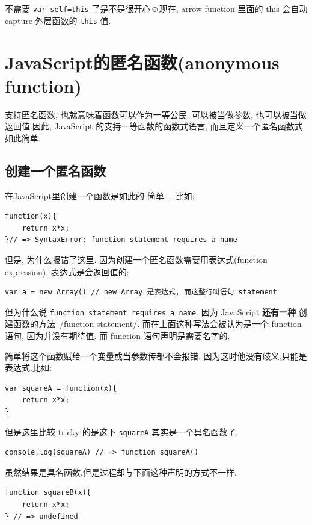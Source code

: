\documentclass[a5paper]{book}
\begin{document}
不需要 \texttt{var self=this} 了是不是很开心☺️现在, arrow function 里面的
this 会自动 capture 外层函数的 \texttt{this} 值.

\chapter{JavaScript的匿名函数(anonymous function)}
\label{sec:orgheadline8}

支持匿名函数, 也就意味着函数可以作为一等公民. 可以被当做参数,
也可以被当做返回值.因此, JavaScript 的支持一等函数的函数式语言,
而且定义一个匿名函数式如此简单.

\section{创建一个匿名函数}
\label{sec:orgheadline6}

在JavaScript里创建一个函数是如此的 \sout{简单} \ldots{} 比如:
\begin{verbatim}
function(x){
    return x*x;
}// => SyntaxError: function statement requires a name
\end{verbatim}

但是, 为什么报错了这里. 因为创建一个匿名函数需要用表达式(function
expression). 表达式是会返回值的:

\begin{verbatim}
var a = new Array() // new Array 是表达式, 而这整行叫语句 statement
\end{verbatim}

但为什么说 \texttt{function statement requires a name}. 因为 JavaScript
\textbf{还有一种} 创建函数的方法--/function statement/.
而在上面这种写法会被认为是一个 function 语句, 因为并没有期待值. 而
function 语句声明是需要名字的.

简单将这个函数赋给一个变量或当参数传都不会报错,
因为这时他没有歧义,只能是表达式.比如:

\begin{verbatim}
var squareA = function(x){
    return x*x;
}
\end{verbatim}

但是这里比较 tricky 的是这下 \texttt{squareA} 其实是一个具名函数了.

\begin{verbatim}
console.log(squareA) // => function squareA()
\end{verbatim}

虽然结果是具名函数,但是过程却与下面这种声明的方式不一样.

\begin{verbatim}
function squareB(x){
    return x*x;
} // => undefined
\end{verbatim}
\end{document}
